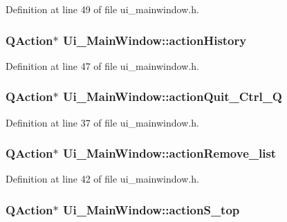 Definition at line 49 of file ui\_\-mainwindow.h.

\hypertarget{classUi__MainWindow_a888a3a2a55d1179693017dc98e281b76}{
\subsubsection[{actionHistory}]{\setlength{\rightskip}{0pt plus 5cm}QAction$\ast$ {\bf Ui\_\-MainWindow::actionHistory}}}
\label{classUi__MainWindow_a888a3a2a55d1179693017dc98e281b76}


Definition at line 47 of file ui\_\-mainwindow.h.

\hypertarget{classUi__MainWindow_a5b3976b2349b3d27d15ef51b0b09513a}{
\subsubsection[{actionQuit\_\-Ctrl\_\-Q}]{\setlength{\rightskip}{0pt plus 5cm}QAction$\ast$ {\bf Ui\_\-MainWindow::actionQuit\_\-Ctrl\_\-Q}}}
\label{classUi__MainWindow_a5b3976b2349b3d27d15ef51b0b09513a}


Definition at line 37 of file ui\_\-mainwindow.h.

\hypertarget{classUi__MainWindow_af6c2d7008e1c022ea212377f7e1d2996}{
\subsubsection[{actionRemove\_\-list}]{\setlength{\rightskip}{0pt plus 5cm}QAction$\ast$ {\bf Ui\_\-MainWindow::actionRemove\_\-list}}}
\label{classUi__MainWindow_af6c2d7008e1c022ea212377f7e1d2996}


Definition at line 42 of file ui\_\-mainwindow.h.

\hypertarget{classUi__MainWindow_a77fdca5e1deec736a80260027d4914ae}{
\subsubsection[{actionS\_\-top}]{\setlength{\rightskip}{0pt plus 5cm}QAction$\ast$ {\bf Ui\_\-MainWindow::actionS\_\-top}}}
\label{classUi__MainWindow_a77fdca5e1deec736a80260027d4914ae}


